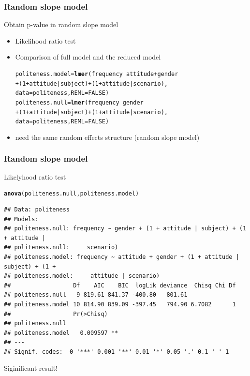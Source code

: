 \documentclass[10p]{beamer}\usepackage[]{graphicx}\usepackage[]{color}
\makeatletter
\newcommand{\hlnum}[1]{\textcolor[rgb]{0.686,0.059,0.569}{#1}}%
\newcommand{\hlopt}[1]{\textcolor[rgb]{0,0,0}{#1}}%
\newcommand{\hlstd}[1]{\textcolor[rgb]{0.345,0.345,0.345}{#1}}%
\newcommand{\hlkwb}[1]{\textcolor[rgb]{0.69,0.353,0.396}{#1}}%
\newcommand{\hlkwc}[1]{\textcolor[rgb]{0.333,0.667,0.333}{#1}}%
\newcommand{\hlkwd}[1]{\textcolor[rgb]{0.737,0.353,0.396}{\textbf{#1}}}%
\newenvironment{kframe}{%
 \def\at@end@of@kframe{}%
 \ifinner\ifhmode%
  \def\at@end@of@kframe{\end{minipage}}%
  \begin{minipage}{\columnwidth}%
 \fi\fi%
 \def\FrameCommand##1{\hskip\@totalleftmargin \hskip-\fboxsep
 \colorbox{shadecolor}{##1}\hskip-\fboxsep
     \hskip-\linewidth \hskip-\@totalleftmargin \hskip\columnwidth}%
 \MakeFramed {\advance\hsize-\width
   \@totalleftmargin\z@ \linewidth\hsize
   \@setminipage}}%
 {\par\unskip\endMakeFramed%
 \at@end@of@kframe}
\newenvironment{knitrout}{}{} %
\makeatother
\begin{document}
\begin{frame}[fragile]
\frametitle{Random slope model}
Obtain p-value in random slope model
\begin{itemize}
\item Likelihood ratio test
\item Comparison of full model and the reduced model
\begin{knitrout}\scriptsize
{}\color{fgcolor}\begin{kframe}
\begin{alltt}
\hlstd{politeness.model} \hlkwb{=} \hlkwd{lmer}\hlstd{(frequency} \hlopt{~} \hlstd{attitude} \hlopt{+} \hlstd{gender}
                        \hlopt{+} \hlstd{(}\hlnum{1}\hlopt{+}\hlstd{attitude}\hlopt{|}\hlstd{subject)}\hlopt{+}\hlstd{(}\hlnum{1}\hlopt{+}\hlstd{attitude}\hlopt{|}\hlstd{scenario),}
                        \hlkwc{data}\hlstd{=politeness,} \hlkwc{REML}\hlstd{=}\hlnum{FALSE}\hlstd{)}
\hlstd{politeness.null} \hlkwb{=} \hlkwd{lmer}\hlstd{(frequency} \hlopt{~} \hlstd{gender}
                       \hlopt{+} \hlstd{(}\hlnum{1}\hlopt{+}\hlstd{attitude}\hlopt{|}\hlstd{subject)} \hlopt{+} \hlstd{(}\hlnum{1}\hlopt{+}\hlstd{attitude}\hlopt{|}\hlstd{scenario),}
                       \hlkwc{data}\hlstd{=politeness,} \hlkwc{REML} \hlstd{=} \hlnum{FALSE}\hlstd{)}
\end{alltt}
\end{kframe}
\end{knitrout}
\item need the same random effects structure (random slope model)
\end{itemize}
\end{frame}

\begin{frame}[fragile]
\frametitle{Random slope model}
Likelyhood ratio test
\begin{knitrout}\scriptsize
{}\color{fgcolor}\begin{kframe}
\begin{alltt}
\hlkwd{anova}\hlstd{(politeness.null, politeness.model)}
\end{alltt}
\begin{verbatim}
## Data: politeness
## Models:
## politeness.null: frequency ~ gender + (1 + attitude | subject) + (1 + attitude | 
## politeness.null:     scenario)
## politeness.model: frequency ~ attitude + gender + (1 + attitude | subject) + (1 + 
## politeness.model:     attitude | scenario)
##                  Df    AIC    BIC  logLik deviance  Chisq Chi Df
## politeness.null   9 819.61 841.37 -400.80   801.61              
## politeness.model 10 814.90 839.09 -397.45   794.90 6.7082      1
##                  Pr(>Chisq)   
## politeness.null               
## politeness.model   0.009597 **
## ---
## Signif. codes:  0 '***' 0.001 '**' 0.01 '*' 0.05 '.' 0.1 ' ' 1
\end{verbatim}
\end{kframe}
\end{knitrout}
Siginificant result!
\end{frame}
\end{document}
